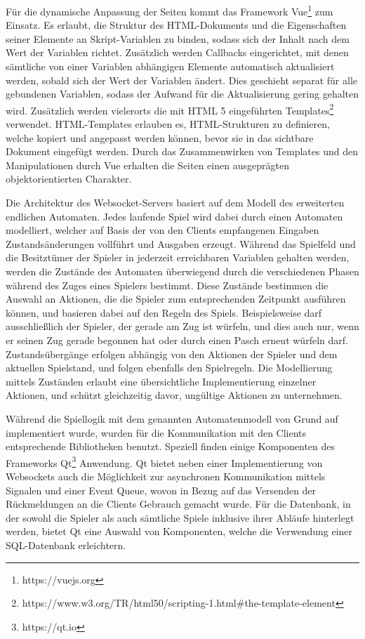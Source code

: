 \documentclass[german]{cgspaper} %
\begin{document}
Für die dynamische Anpassung der Seiten kommt das Framework Vue\footnote{https://vuejs.org} zum Einsatz.
Es erlaubt, die Struktur des HTML-Dokuments und die Eigenschaften seiner Elemente an Skript-Variablen zu binden, sodass sich der Inhalt nach dem Wert der Variablen richtet.
Zusätzlich werden Callbacks eingerichtet, mit denen sämtliche von einer Variablen abhängigen Elemente automatisch aktualisiert werden, sobald sich der Wert der Variablen ändert.
Dies geschieht separat für alle gebundenen Variablen, sodass der Aufwand für die Aktualisierung gering gehalten wird.
Zusätzlich werden vielerorts die mit HTML 5 eingeführten Templates\footnote{https://www.w3.org/TR/html50/scripting-1.html\#the-template-element} 
verwendet.
HTML-Templates erlauben es, HTML-Strukturen zu definieren, welche kopiert und angepasst werden können, bevor sie in das sichtbare Dokument eingefügt werden.
Durch das Zusammenwirken von Templates und den Manipulationen durch Vue erhalten die Seiten einen ausgeprägten objektorientierten Charakter.

Die Architektur des Websocket-Servers basiert auf dem Modell des erweiterten endlichen Automaten.
Jedes laufende Spiel wird dabei durch einen Automaten modelliert, welcher auf Basis der von den Clients empfangenen Eingaben Zustandsänderungen vollführt und Ausgaben erzeugt.
Während das Spielfeld und die Besitztümer der Spieler in jederzeit erreichbaren Variablen gehalten werden, werden die Zustände des Automaten überwiegend durch die verschiedenen Phasen während des Zuges eines Spielers bestimmt.
Diese Zustände bestimmen die Auswahl an Aktionen, die die Spieler zum entsprechenden Zeitpunkt ausführen können, und basieren dabei auf den Regeln des Spiels.
Beispielsweise darf ausschließlich der Spieler, der gerade am Zug ist würfeln, und dies auch nur, wenn er seinen Zug gerade begonnen hat oder durch einen Pasch erneut würfeln darf.
Zustandsübergänge erfolgen abhängig von den Aktionen der Spieler und dem aktuellen Spielstand, und folgen ebenfalls den Spielregeln.
Die Modellierung mittels Zuständen erlaubt eine übersichtliche Implementierung einzelner Aktionen, und schützt gleichzeitig davor, ungültige Aktionen zu unternehmen.

Während die Spiellogik mit dem genannten Automatenmodell von Grund auf implementiert wurde, wurden für die Kommunikation mit den Clients entsprechende Bibliotheken benutzt.
Speziell finden einige Komponenten des Frameworks Qt\footnote{https://qt.io} Anwendung.
Qt bietet neben einer Implementierung von Websockets auch die Möglichkeit zur asynchronen Kommunikation mittels Signalen und einer Event Queue, wovon in Bezug auf das Versenden der Rückmeldungen an die Clients Gebrauch gemacht wurde.
Für die Datenbank, in der sowohl die Spieler als auch sämtliche Spiele inklusive ihrer Abläufe hinterlegt werden, bietet Qt eine Auswahl von Komponenten, welche die Verwendung einer SQL-Datenbank erleichtern.
\end{document}
